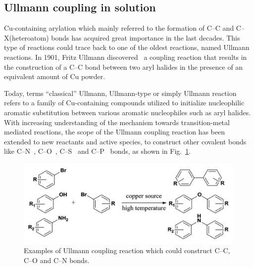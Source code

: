 \documentclass[%
 reprint,
 amsmath,amssymb,
 aps,
prb,
]{revtex4-1}
\begin{document}
\subsection{\label{sec:level2}Ullmann coupling in solution}

Cu-containing arylation which mainly referred to the formation of C--C and C--X(heteroatom) bonds has acquired great importance in the last decades. This type of reactions could trace back to one of the oldest reactions, named Ullmann reactions.
In 1901, Fritz Ullmann discovered~\cite{ullmann_01} a coupling reaction that results in the construction of a C--C bond between two aryl halides in the presence of an equivalent amount of Cu powder.

Today, terms ``classical'' Ullmann, Ullmann-type or simply Ullmann reaction refers to a family of Cu-containing compounds utilized to initialize nucleophilic aromatic substitution between various aromatic nucleophiles such as aryl halides.
With increasing understanding of the mechanism towards transition-metal mediated reactions, the scope of the Ullmann coupling reaction has been extended to new reactants and active species, to construct other covalent bonds like C--N~\cite{ullmann_02, ullmann_03}, C--O~\cite{ullmann_04}, C--S~\cite{ullmann_05} and C--P~\cite{ullmann_21,ullmann_22} bonds, as shown in Fig.~\ref{fig:UllmannCoupling}\cite{ullmann_30}.
\begin{figure}[htb]
\centering
\includegraphics[width=0.75\columnwidth]{Fig/classical.png}%
\caption{Examples of Ullmann coupling reaction which could construct C--C, C--O and C--N bonds.}
\label{fig:UllmannCoupling}
\end{figure}
\end{document}
